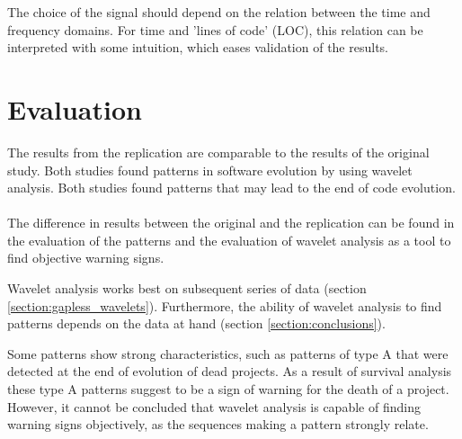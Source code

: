 The choice of the signal should depend on the relation between the time and
frequency domains. For time and 'lines of code' (LOC), this relation can be
interpreted with some intuition, which eases validation of the results.

\section{Evaluation}
The results from the replication are comparable to the results of the original
study. Both studies found patterns in software evolution by using wavelet
analysis. Both studies found patterns that may lead to the end of code
evolution.

\paragraph{}
The difference in results between the original and the replication can be found
in the evaluation of the patterns and the evaluation of wavelet analysis as a
tool to find objective warning signs.

Wavelet analysis works best on subsequent series of data (section
\ref{section:gapless_wavelets}). Furthermore, the ability of wavelet analysis
to find patterns depends on the data at hand (section \ref{section:conclusions}).

Some patterns show strong characteristics, such as patterns of type A that were
detected at the end of evolution of dead projects. As a result of survival
analysis these type A patterns suggest to be a sign of warning for the death
of a project. However, it cannot be concluded that wavelet analysis is capable
of finding warning signs objectively, as the sequences making a pattern
strongly relate.

\begin{comment}
About original study:
- research questions
- participants
- design
- artifacts
- context variables
- summary of results

About replication:
- motivation
- level of interaction with original researchers
- changes to the original experiment

Comparison of results:
- consistent results
- differences in results

Conclude across studies.

\end{comment}